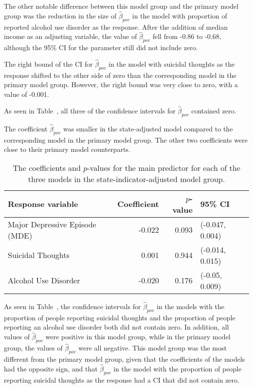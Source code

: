 \documentclass{article}
\begin{document}
The other notable difference between this model group and the
primary model group was the reduction in the
size of $\hat{\beta}_{pov}$ in the model with
proportion of reported alcohol use disorder as the response.
After the addition of median income as an adjusting variable,
the value of $\hat{\beta}_{pov}$ fell from -0.86 to -0.68,
although the 95\% CI for the parameter still did not include zero.

The right bound of the CI for $\hat{\beta}_{pov}$ in the
model with suicidal thoughts as the response
shifted to the other side of zero than the corresponding model
in the primary model group.
However, the right bound was very close to zero,
with a value of -0.001.

As seen in Table~\label{tab:state-ind-model-results},
all three of the confidence intervals for
$\hat{\beta}_{pov}$ contained zero.

The coefficient $\hat{\beta}_{pov}$ was smaller
in the state-adjusted model compared to the
corresponding model in the
primary model group.
The other two coefficients were close to their
primary model counterparts.

\begin{table}[!htb]
\begin{center}
\begin{tabular}{l r r l}
    \toprule
    Response variable & Coefficient & $p$-value & 95\% CI\\
    \midrule
    Major Depressive Episode (MDE) & -0.022 & 0.093 & (-0.047, 0.004)\\
    Suicidal Thoughts & 0.001 & 0.944 & (-0.014, 0.015)\\
    Alcohol Use Disorder & -0.020 & 0.176 & (-0.05, 0.009)\\
    \bottomrule
\end{tabular}
\caption{\label{tab:state-ind-model-results} The coefficients and $p$-values
    for the main predictor for each of the three models
    in the state-indicator-adjusted model group.
}
\end{center}
\end{table}

As seen in Table~\label{tab:state-ind-only-model-results},
the confidence intervals for $\hat{\beta}_{pov}$
in the models with the proportion of people
reporting suicidal thoughts
and the proportion of people reporting an alcohol use disorder
both did not contain zero.
In addition, all values of $\hat{\beta}_{pov}$
were positive in this model group,
while in the primary model group,
the values of $\hat{\beta}_{pov}$
were all negative.
This model group was the most different from the primary model group,
given that the coefficients of the models had the opposite sign,
and that $\hat{\beta}_{pov}$ in the model
with the proportion of people reporting suicidal thoughts
as the response had a CI that did not contain zero.
\end{document}
